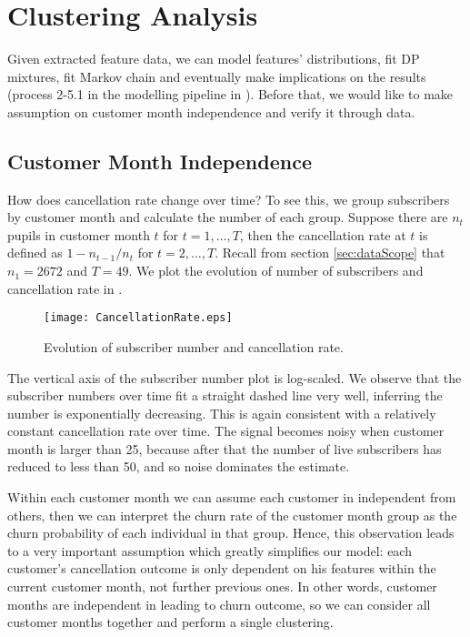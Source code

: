 \section{Clustering Analysis}
\label{sec:clustering}

Given extracted feature data, we can model features' distributions, fit DP mixtures, fit Markov chain and eventually make implications on the results (process 2-5.1 in the modelling pipeline in ). Before that, we would like to make assumption on customer month independence and verify it through data.

\subsection{Customer Month Independence}

How does cancellation rate change over time? To see this, we group subscribers by customer month and calculate the number of each group. Suppose there are $n_t$ pupils in customer month $t$ for $t=1,\dots,T$, then the cancellation rate at $t$ is defined as $1-n_{t-1} / n_t$ for $t=2,\dots, T$. Recall from section \ref{sec:dataScope} that $n_1 = 2672$ and $T = 49$. We plot the evolution of number of subscribers and cancellation rate in .

\begin{figure}[!h]
\centering
\texttt{[image: CancellationRate.eps]}
\caption{Evolution of subscriber number and cancellation rate.}
\label{fig:cancellationRate}
\end{figure}

The vertical axis of the subscriber number plot is log-scaled. We observe that the subscriber numbers over time fit a straight dashed line very well, inferring the number is exponentially decreasing. This is again consistent with a relatively constant cancellation rate over time. The signal becomes noisy when customer month is larger than 25, because after that the number of live subscribers has reduced to less than 50, and so noise dominates the estimate.

Within each customer month we can assume each customer in independent from others, then we can interpret the churn rate of the customer month group as the churn probability of each individual in that group. Hence, this observation leads to a very important assumption which greatly simplifies our model: each customer's cancellation outcome is only dependent on his features within the current customer month, not further previous ones. In other words, customer months are independent in leading to churn outcome, so we can consider all customer months together and perform a single clustering. %

